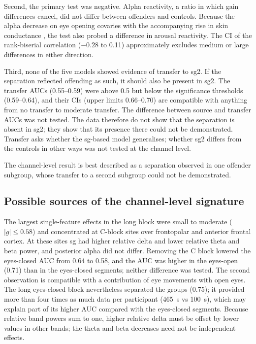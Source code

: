 Second, the primary test was negative. Alpha reactivity, a ratio in which gain differences cancel, did not differ between offenders and controls. Because the alpha decrease on eye opening covaries with the accompanying rise in skin conductance \cite{Barry2007}, the test also probed a difference in arousal reactivity. The CI of the rank-biserial correlation ($-0.28$ to 0.11) approximately excludes medium or large differences in either direction.

Third, none of the five models showed evidence of transfer to sg2. If the separation reflected offending as such, it should also be present in sg2. The transfer AUCs (0.55--0.59) were above 0.5 but below the significance thresholds (0.59--0.64), and their CIs (upper limits 0.66--0.70) are compatible with anything from no transfer to moderate transfer. The difference between source and transfer AUCs was not tested. The data therefore do not show that the separation is absent in sg2; they show that its presence there could not be demonstrated. Transfer asks whether the sg-based model generalises; whether sg2 differs from the controls in other ways was not tested at the channel level.

The channel-level result is best described as a separation observed in one offender subgroup, whose transfer to a second subgroup could not be demonstrated.

\subsection{Possible sources of the channel-level signature}
\label{sec:disc-source}

The largest single-feature effects in the long block were small to moderate ($|g| \le 0.58$) and concentrated at C-block sites over frontopolar and anterior frontal cortex. At these sites sg had higher relative delta and lower relative theta and beta power, and posterior alpha did not differ. Removing the C block lowered the eyes-closed AUC from 0.64 to 0.58, and the AUC was higher in the eyes-open (0.71) than in the eyes-closed segments; neither difference was tested. The second observation is compatible with a contribution of eye movements with open eyes. The long eyes-closed block nevertheless separated the groups (0.75); it provided more than four times as much data per participant (465~s vs 100~s), which may explain part of its higher AUC compared with the eyes-closed segments. Because relative band powers sum to one, higher relative delta must be offset by lower values in other bands; the theta and beta decreases need not be independent effects.

